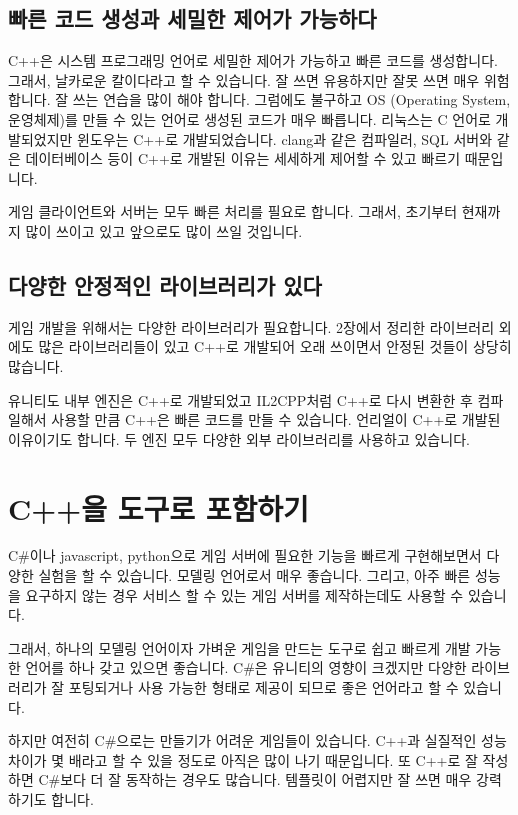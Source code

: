\subsection{빠른 코드 생성과 세밀한 제어가 가능하다}

C++은 시스템 프로그래밍 언어로 세밀한 제어가 가능하고 빠른 코드를 생성합니다. 그래서, 
날카로운 칼이다라고 할 수 있습니다. 잘 쓰면 유용하지만 잘못 쓰면 매우 위험합니다. 
잘 쓰는 연습을 많이 해야 합니다. 그럼에도 불구하고 OS (Operating System, 운영체제)를 만들 
수 있는 언어로 생성된 코드가 매우 빠릅니다. 리눅스는 C 언어로 개발되었지만 윈도우는 C++로 
개발되었습니다. clang과 같은 컴파일러, SQL 서버와 같은 데이터베이스 등이 C++로 개발된 
이유는 세세하게 제어할 수 있고 빠르기 때문입니다. 

게임 클라이언트와 서버는 모두 빠른 처리를 필요로 합니다. 그래서, 초기부터 현재까지 많이 
쓰이고 있고 앞으로도 많이 쓰일 것입니다. 

\subsection{다양한 안정적인 라이브러리가 있다}

게임 개발을 위해서는 다양한 라이브러리가 필요합니다. 2장에서 정리한 라이브러리 외에도 
많은 라이브러리들이 있고 C++로 개발되어 오래 쓰이면서 안정된 것들이 상당히 많습니다. 

유니티도 내부 엔진은 C++로 개발되었고 IL2CPP처럼 C++로 다시 변환한 후 컴파일해서 사용할
만큼 C++은 빠른 코드를 만들 수 있습니다. 언리얼이 C++로 개발된 이유이기도 합니다. 두 엔진 
모두 다양한 외부 라이브러리를 사용하고 있습니다. 

\section{C++을 도구로 포함하기}

C\#이나 javascript, python으로 게임 서버에 필요한 기능을 빠르게 구현해보면서 다양한 
실험을 할 수 있습니다. 모델링 언어로서 매우 좋습니다. 그리고, 아주 빠른 성능을 요구하지 
않는 경우 서비스 할 수 있는 게임 서버를 제작하는데도 사용할 수 있습니다. 

그래서, 하나의 모델링 언어이자 가벼운 게임을 만드는 도구로 쉽고 빠르게 개발 가능한 
언어를 하나 갖고 있으면 좋습니다. C\#은 유니티의 영향이 크겠지만 다양한 라이브러리가 
잘 포팅되거나 사용 가능한 형태로 제공이 되므로 좋은 언어라고 할 수 있습니다. 

하지만 여전히 C\#으로는 만들기가 어려운 게임들이 있습니다. C++과 실질적인 성능 차이가 
몇 배라고 할 수 있을 정도로 아직은 많이 나기 때문입니다. 또 C++로 잘 작성하면 C\#보다 
더 잘 동작하는 경우도 많습니다. 템플릿이 어렵지만 잘 쓰면 매우 강력하기도 합니다. 

